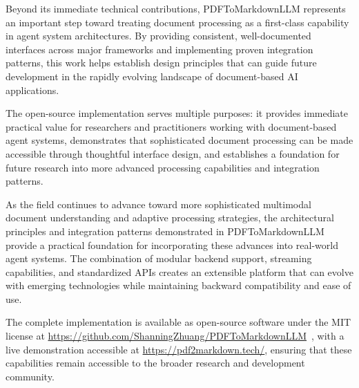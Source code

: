 \documentclass{article}
\begin{document}
Beyond its immediate technical contributions, PDFToMarkdownLLM represents an important step toward treating document processing as a first-class capability in agent system architectures. By providing consistent, well-documented interfaces across major frameworks and implementing proven integration patterns, this work helps establish design principles that can guide future development in the rapidly evolving landscape of document-based AI applications.

The open-source implementation serves multiple purposes: it provides immediate practical value for researchers and practitioners working with document-based agent systems, demonstrates that sophisticated document processing can be made accessible through thoughtful interface design, and establishes a foundation for future research into more advanced processing capabilities and integration patterns.

As the field continues to advance toward more sophisticated multimodal document understanding and adaptive processing strategies, the architectural principles and integration patterns demonstrated in PDFToMarkdownLLM provide a practical foundation for incorporating these advances into real-world agent systems. The combination of modular backend support, streaming capabilities, and standardized APIs creates an extensible platform that can evolve with emerging technologies while maintaining backward compatibility and ease of use.

The complete implementation is available as open-source software under the MIT license at \url{https://github.com/ShanningZhuang/PDFToMarkdownLLM}~\cite{zhuang2024pdftomarkdownllm}, with a live demonstration accessible at \url{https://pdf2markdown.tech/}, ensuring that these capabilities remain accessible to the broader research and development community.



\end{document}
